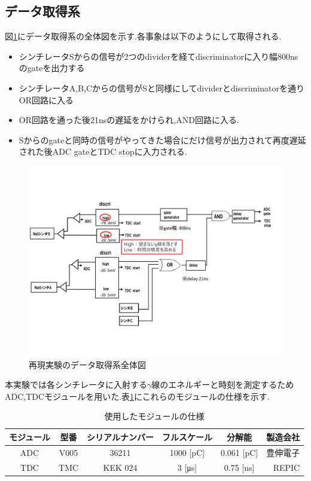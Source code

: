 \subsection{データ取得系}\label{DAQ}
図\ref{fig:circuit2015}にデータ取得系の全体図を示す.各事象は以下のようにして取得される.
\begin{itemize}
		\item シンチレータSからの信号が2つのdividerを経てdiscriminatorに入り幅800nsのgateを出力する
		\item シンチレータA,B,Cからの信号がSと同様にしてdividerとdiscriminatorを通りOR回路に入る
		\item OR回路を通った後21nsの遅延をかけられ,AND回路に入る.
		\item Sからのgateと同時の信号がやってきた場合にだけ信号が出力されて再度遅延された後ADC gateとTDC stopに入力される.
\end{itemize}
\begin{figure}[htbp]
	\centering
		\includegraphics[width=15cm]{fig/isb/circuit.pdf}
		\caption{再現実験のデータ取得系全体図~\cite{卒業発表2015}}
		\label{fig:circuit2015}
\end{figure}

本実験では各シンチレータに入射する$\gamma$線のエネルギーと時刻を測定するためADC,TDCモジュールを用いた.表\ref{module2016}にこれらのモジュールの仕様を示す.
\begin{table}[H]
	\centering
	\begin{tabular}{|c|c|c|c|c|r|} \hline
		モジュール & 型番 & シリアルナンバー & フルスケール & 分解能 & 製造会社 \\ \hline \hline
		ADC & V005 & 36211 & 1000 [\si{\pico\coulomb}] & 0.061 [\si{\pico\coulomb}] & 豊伸電子 \\ \hline
		TDC & TMC & KEK 024 & 3 [\si{\micro\second}] & 0.75 [\si{\nano\second}] & REPIC \\ \hline
	\end{tabular}
	\caption{使用したモジュールの仕様}
	\label{module2016}
\end{table}

